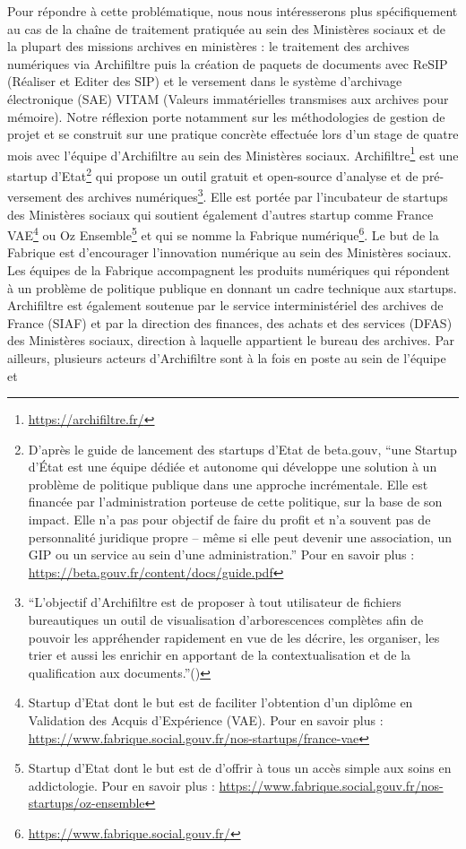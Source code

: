 \documentclass[a4paper,12pt,twoside]{book}
\begin{document}
Pour répondre à cette problématique, nous nous intéresserons plus spécifiquement au cas de la chaîne de traitement pratiquée au sein des Ministères sociaux et de la plupart des missions archives en ministères : le traitement des archives numériques via \gls{Archifiltre} puis la création de paquets de documents avec ReSIP (Réaliser et Editer des \gls{SIP}) et le versement dans le système d’archivage électronique (\gls{SAE}) \gls{VITAM} (Valeurs immatérielles transmises aux archives pour mémoire). Notre réflexion porte notamment sur les méthodologies de gestion de projet et se construit sur une pratique concrète effectuée lors d’un stage de quatre mois avec l’équipe d’\gls{Archifiltre} au sein des Ministères sociaux. Archifiltre\footnote{\href{https://archifiltre.fr/}{https://archifiltre.fr/}} est une startup d’Etat\footnote{D’après le guide de lancement des startups d’Etat de beta.gouv, \enquote{une Startup d’État est une équipe dédiée et autonome qui développe une solution à un problème de politique publique dans une approche incrémentale. Elle est financée par l’administration porteuse de cette politique, sur la base de son impact. Elle n’a pas pour objectif de faire du profit et n’a souvent pas de personnalité juridique propre – même si elle peut devenir une association, un GIP ou un service au sein d’une administration.} Pour en savoir plus : \href{https://beta.gouv.fr/content/docs/guide.pdf}{https://beta.gouv.fr/content/docs/guide.pdf}} qui propose un outil gratuit et open-source d’analyse et de pré-versement des archives numériques\footnote{\enquote{L’objectif d’Archifiltre est de proposer à tout utilisateur de fichiers bureautiques un outil de visualisation d’arborescences complètes afin de pouvoir les appréhender rapidement en vue de les décrire, les organiser, les trier et aussi les enrichir en apportant de la contextualisation et de la qualification aux documents.}(\cite{naud_trois_2019})}. Elle est portée par l’incubateur de startups des Ministères sociaux qui soutient également d’autres startup comme France VAE\footnote{Startup d’Etat dont le but est de faciliter l’obtention d’un diplôme en Validation des Acquis d’Expérience (VAE). Pour en savoir plus : \href{https://www.fabrique.social.gouv.fr/nos-startups/france-vae}{https://www.fabrique.social.gouv.fr/nos-startups/france-vae}} ou Oz Ensemble\footnote{Startup d’Etat dont le but est de d’offrir à tous un accès simple aux soins en addictologie. Pour en savoir plus : \href{https://www.fabrique.social.gouv.fr/nos-startups/oz-ensemble}{https://www.fabrique.social.gouv.fr/nos-startups/oz-ensemble}} et qui se nomme la Fabrique numérique\footnote{ \href{https://www.fabrique.social.gouv.fr/}{https://www.fabrique.social.gouv.fr/}}. Le but de la Fabrique est d’encourager l’innovation numérique au sein des Ministères sociaux. Les équipes de la Fabrique accompagnent les produits numériques qui répondent à un problème de politique publique en donnant un cadre technique aux startups. \gls{Archifiltre} est également soutenue par le service interministériel des archives de France (SIAF) et par la direction des finances, des achats et des services (DFAS) des Ministères sociaux, direction à laquelle appartient le bureau des archives. Par ailleurs, plusieurs acteurs d’\gls{Archifiltre} sont à la fois en poste au sein de l’équipe et 
\end{document}
